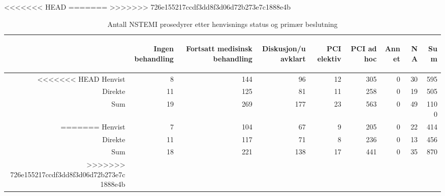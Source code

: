 \documentclass[presentation,xcolor=pdftex,dvipsnames,table]{beamer}
\begin{document}
\begin{frame}
\begin{tiny}
<<<<<<< HEAD
=======
>>>>>>> 726e155217ccdf3dd8f3d06d72b273e7c1888e4b
\begin{table}[ht]
\centering
\begin{tabular}{rrrrrrrrr}
  \toprule
 & \begin{sideways} Ingen behandling \end{sideways} & \begin{sideways} Fortsatt medisinsk behandling \end{sideways} & \begin{sideways} Diskusjon/uavklart \end{sideways} & \begin{sideways} PCI elektiv \end{sideways} & \begin{sideways} PCI ad hoc \end{sideways} & \begin{sideways} Annet \end{sideways} & \begin{sideways} NA \end{sideways} & \begin{sideways} Sum \end{sideways} \\ 
  \midrule
<<<<<<< HEAD
Henvist & 8 & 144 & 96 & 12 & 305 & 0 & 30 & 595 \\ 
  Direkte & 11 & 125 & 81 & 11 & 258 & 0 & 19 & 505 \\ 
  Sum & 19 & 269 & 177 & 23 & 563 & 0 & 49 & 1100 \\ 
=======
Henvist & 7 & 104 & 67 & 9 & 205 & 0 & 22 & 414 \\ 
  Direkte & 11 & 117 & 71 & 8 & 236 & 0 & 13 & 456 \\ 
  Sum & 18 & 221 & 138 & 17 & 441 & 0 & 35 & 870 \\ 
>>>>>>> 726e155217ccdf3dd8f3d06d72b273e7c1888e4b
   \bottomrule
\end{tabular}
\caption{Antall NSTEMI prosedyrer etter henvisnings status og primær beslutning} 
\end{table}\end{tiny}
\end{frame}
\end{document}
